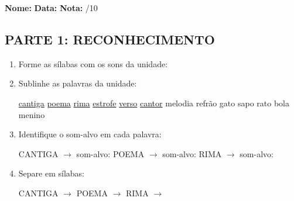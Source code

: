 \begin{exercicio}

\noindent\textbf{Nome:} \underline{\hspace{3.2cm}} \quad \textbf{Data:} \underline{\hspace{1.6cm}} \quad \textbf{Nota:} \underline{\hspace{0.9cm}}/10


\subsection*{PARTE 1: RECONHECIMENTO}

\begin{enumerate}

  \item Forme as sílabas com os sons da unidade:

\begin{center}
\end{center}

  \item Sublinhe as palavras da unidade:

\begin{center}
  \uline{cantiga} \quad \uline{poema} \quad \uline{rima} \quad \uline{estrofe} \quad \uline{verso} \quad \uline{cantor} \quad melodia \quad refrão \quad gato \quad sapo \quad rato \quad bola \quad menino
\end{center}

  \item Identifique o som-alvo em cada palavra:
  \begin{center}
  CANTIGA $\rightarrow$ som-alvo: \underline{\hspace{1cm}} \quad POEMA $\rightarrow$ som-alvo: \underline{\hspace{1cm}} \quad RIMA $\rightarrow$ som-alvo: \underline{\hspace{1cm}}
  \end{center}

  \item Separe em sílabas:
  \begin{center}
  CANTIGA $\rightarrow$ \underline{\hspace{1cm}} \quad POEMA $\rightarrow$ \underline{\hspace{1cm}} \quad RIMA $\rightarrow$ \underline{\hspace{1cm}}
  \end{center}


\end{enumerate}
\end{exercicio}
